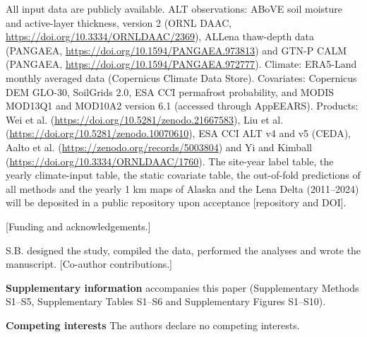 \ifnum{}
All input data are publicly available. ALT observations: ABoVE soil moisture and active-layer thickness, version 2 (ORNL DAAC, \url{https://doi.org/10.3334/ORNLDAAC/2369}), ALLena thaw-depth data (PANGAEA, \url{https://doi.org/10.1594/PANGAEA.973813}) and GTN-P CALM (PANGAEA, \url{https://doi.org/10.1594/PANGAEA.972777}). Climate: ERA5-Land monthly averaged data (Copernicus Climate Data Store). Covariates: Copernicus DEM GLO-30, SoilGrids 2.0, ESA CCI permafrost probability, and MODIS MOD13Q1 and MOD10A2 version 6.1 (accessed through AppEEARS). Products: Wei et al. (\url{https://doi.org/10.5281/zenodo.21667583}), Liu et al. (\url{https://doi.org/10.5281/zenodo.10070610}), ESA CCI ALT v4 and v5 (CEDA), Aalto et al. (\url{https://zenodo.org/records/5003804}) and Yi and Kimball (\url{https://doi.org/10.3334/ORNLDAAC/1760}). The site-year label table, the yearly climate-input table, the static covariate table, the out-of-fold predictions of all methods and the yearly 1 km maps of Alaska and the Lena Delta (2011--2024) will be deposited in a public repository upon acceptance [repository and DOI].
\fi

\ifnum{}
[Funding and acknowledgements.]

S.B. designed the study, compiled the data, performed the analyses and wrote the manuscript. [Co-author contributions.]

\textbf{Supplementary information} accompanies this paper (Supplementary Methods S1--S5, Supplementary Tables S1--S6 and Supplementary Figures S1--S10).

\textbf{Competing interests} The authors declare no competing interests.
\fi
